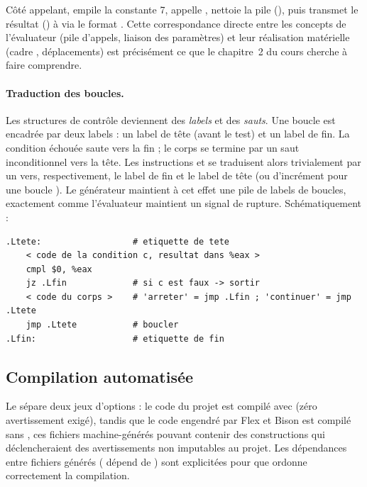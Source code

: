 Côté appelant,  empile la constante 7, appelle
, nettoie la pile (), puis transmet le
résultat () à  via le format .
Cette correspondance directe entre les concepts de l'évaluateur (pile d'appels,
liaison des paramètres) et leur réalisation matérielle (cadre ,
déplacements) est précisément ce que le chapitre~2 du cours cherche à faire
comprendre.

\paragraph{Traduction des boucles.} Les structures de contrôle deviennent des
\emph{labels} et des \emph{sauts}. Une boucle  est
encadrée par deux labels : un label de tête (avant le test) et un label de fin.
La condition échouée saute vers la fin ; le corps se termine par un saut
inconditionnel vers la tête. Les instructions  et 
se traduisent alors trivialement par un  vers, respectivement, le label
de fin et le label de tête (ou d'incrément pour une boucle ). Le
générateur maintient à cet effet une pile de labels de boucles, exactement comme
l'évaluateur maintient un signal de rupture. Schématiquement :

\begin{lstlisting}[style=asm,caption={Schéma de traduction d'une boucle \code{tant que}.}]
.Ltete:                  # etiquette de tete
    < code de la condition c, resultat dans %eax >
    cmpl $0, %eax
    jz .Lfin             # si c est faux -> sortir
    < code du corps >    # 'arreter' = jmp .Lfin ; 'continuer' = jmp .Ltete
    jmp .Ltete           # boucler
.Lfin:                   # etiquette de fin
\end{lstlisting}

\subsection{Compilation automatisée}

Le  sépare deux jeux d'options : le code du projet est compilé avec
 (zéro avertissement exigé), tandis que le code engendré par
Flex et Bison est compilé sans , ces fichiers machine-générés
pouvant contenir des constructions qui déclencheraient des avertissements non
imputables au projet. Les dépendances entre fichiers générés (
dépend de ) sont explicitées pour que  ordonne
correctement la compilation.


